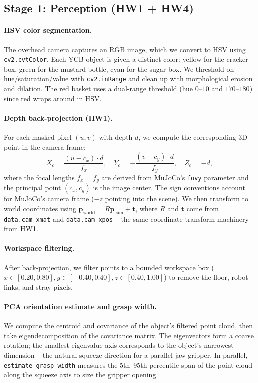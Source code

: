 \documentclass[11pt]{article}
\begin{document}
\subsection{Stage 1: Perception (HW1 + HW4)}

\paragraph{HSV color segmentation.}
The overhead camera captures an RGB image, which we convert to HSV using
\texttt{cv2.cvtColor}. Each YCB object is given a distinct color: yellow
for the cracker box, green for the mustard bottle, cyan for the sugar
box. We threshold on hue/saturation/value with \texttt{cv2.inRange} and
clean up with morphological erosion and dilation. The red basket uses a
dual-range threshold (hue $0$--$10$ and $170$--$180$) since red wraps
around in HSV.

\paragraph{Depth back-projection (HW1).}
For each masked pixel $(u, v)$ with depth $d$, we compute the
corresponding 3D point in the camera frame:
\[
X_c = \frac{(u - c_x) \cdot d}{f_x}, \quad
Y_c = -\frac{(v - c_y) \cdot d}{f_y}, \quad
Z_c = -d,
\]
where the focal lengths $f_x = f_y$ are derived from MuJoCo's \texttt{fovy}
parameter and the principal point $(c_x, c_y)$ is the image center. The
sign conventions account for MuJoCo's camera frame ($-z$ pointing into
the scene). We then transform to world coordinates using
$\mathbf{p}_{\text{world}} = R \mathbf{p}_{\text{cam}} + \mathbf{t}$,
where $R$ and $\mathbf{t}$ come from \texttt{data.cam\_xmat} and
\texttt{data.cam\_xpos} -- the same coordinate-transform machinery from
HW1.

\paragraph{Workspace filtering.}
After back-projection, we filter points to a bounded workspace box
($x\in[0.20, 0.80], y\in[-0.40, 0.40], z\in[0.40, 1.00]$) to remove the
floor, robot links, and stray pixels.

\paragraph{PCA orientation estimate and grasp width.}
We compute the centroid and covariance of the object's filtered point
cloud, then take eigendecomposition of the covariance matrix. The
eigenvectors form a coarse rotation; the smallest-eigenvalue axis
corresponds to the object's narrowest dimension -- the natural squeeze
direction for a parallel-jaw gripper. In parallel,
\texttt{estimate\_grasp\_width} measures the 5th--95th percentile span of
the point cloud along the squeeze axis to size the gripper opening.
\end{document}
